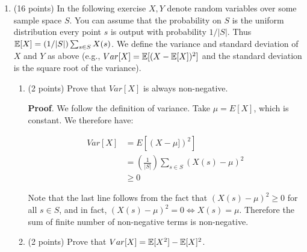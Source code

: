 \documentclass{article}
\begin{document}
\begin{enumerate}%

\item{}
(16 points) In the following exercise $X,Y$ denote random variables over some sample space $S$.
You can assume that the probability on $S$ is the uniform distribution\textemdash{} every point
$s$ is output with probability $1/|S|$. 
Thus $\mathbb{E}[X]= (1/|S|)\sum_{s\in S}X(s)$.
We define the variance and standard deviation of $X$ and $Y$ as above (e.g.,
$Var[X] = \mathbb{E} [ (X-\mathbb{E}[X])^2 ]$ and the standard deviation is the square root of the variance).%

\begin{enumerate}[,label=\alph*.]%

\item{}
(2 points) Prove that $Var[X]$ is always non-negative.%

\begin{mdbmarginx}{1ex}{0pt}{1ex}{0pt}%
\noindent{}\textbf{Proof}.  We follow the definition of variance. Take $\mu = E[X]$, which is constant. We therefore have:%
\end{mdbmarginx}%
\noindent\noindent\[%
\begin{aligned} 
Var[X] &= E[(X - \mu])^2] \\
&= \left(\frac{1}{|S|}\right) \sum_{s \in S} (X(s) - \mu)^2 \\
&\geq 0 
\end{aligned}
\]%

Note that the last line follows from the fact that $(X(s) - \mu)^2 \geq 0$ for all $s \in S$, 
and in fact, $(X(s) - \mu)^2 = 0 \iff X(s) = \mu$. Therefore the sum of finite number of
non-negative terms is non-negative.
\mdfloatright{\ensuremath{\Box}}%

\item{}
(2 points) Prove that $Var[X] = \mathbb{E}[X^2] - \mathbb{E}[X]^2$.%


\end{enumerate}
\end{enumerate}
\end{document}
